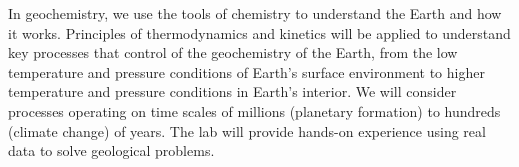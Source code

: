 In geochemistry, we use the tools of chemistry to understand the Earth and how it works. Principles of thermodynamics and kinetics will be applied to understand key processes that control of the geochemistry of the Earth, from the low temperature and pressure conditions of Earth's surface environment to higher temperature and pressure conditions in Earth's interior. We will consider processes operating on time scales of millions (planetary formation) to hundreds (climate change) of years. The lab will provide hands-on experience using real data to solve geological problems.

